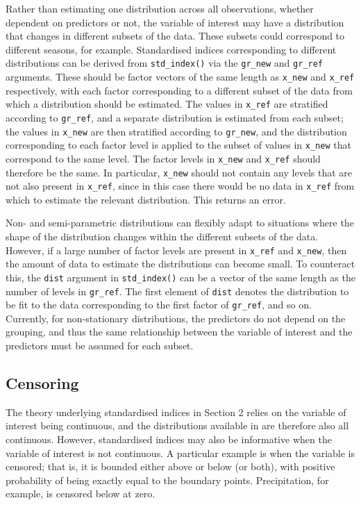 Rather than estimating one distribution across all observations, whether dependent on predictors or not, the variable of interest may have a distribution that changes in different subsets of the data. These subsets could correspond to different seasons, for example. Standardised indices corresponding to different distributions can be derived from \texttt{std\_index()} via the \texttt{gr\_new} and \texttt{gr\_ref} arguments. These should be factor vectors of the same length as \texttt{x\_new} and \texttt{x\_ref} respectively, with each factor corresponding to a different subset of the data from which a distribution should be estimated. The values in \texttt{x\_ref} are stratified according to \texttt{gr\_ref}, and a separate distribution is estimated from each subset; the values in \texttt{x\_new} are then stratified according to \texttt{gr\_new}, and the distribution corresponding to each factor level is applied to the subset of values in \texttt{x\_new} that correspond to the same level. The factor levels in \texttt{x\_new} and \texttt{x\_ref} should therefore be the same. In particular, \texttt{x\_new} should not contain any levels that are not also present in \texttt{x\_ref}, since in this case there would be no data in \texttt{x\_ref} from which to estimate the relevant distribution. This returns an error.

Non- and semi-parametric distributions can flexibly adapt to situations where the shape of the distribution changes within the different subsets of the data. However, if a large number of factor levels are present in \texttt{x\_ref} and \texttt{x\_new}, then the amount of data to estimate the distributions can become small. To counteract this, the \texttt{dist} argument in \texttt{std\_index()} can be a vector of the same length as the number of levels in \texttt{gr\_ref}. The first element of \texttt{dist} denotes the distribution to be fit to the data corresponding to the first factor of \texttt{gr\_ref}, and so on. Currently, for non-stationary distributions, the predictors do not depend on the grouping, and thus the same relationship between the variable of interest and the predictors must be assumed for each subset.

\hypertarget{censoring}{%
\subsection{Censoring}\label{censoring}}

The theory underlying standardised indices in Section 2 relies on the variable of interest being continuous, and the distributions available in  are therefore also all continuous. However, standardised indices may also be informative when the variable of interest is not continuous. A particular example is when the variable is censored; that is, it is bounded either above or below (or both), with positive probability of being exactly equal to the boundary points. Precipitation, for example, is censored below at zero.

